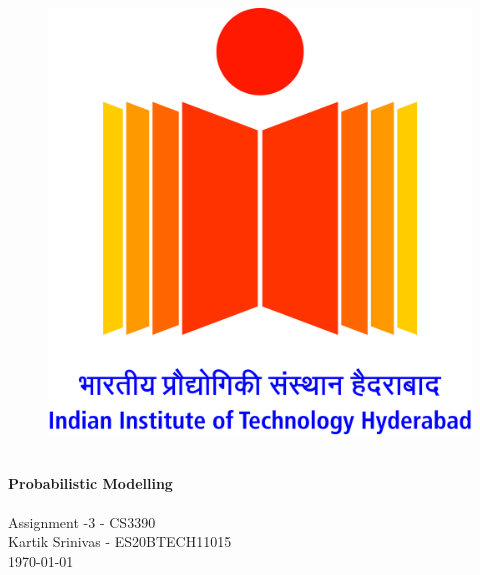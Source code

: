 \begin{titlepage}
    \vbox{ }

    \vbox{ }

    \begin{center}
        \begin{figure}
            \centering
            \includegraphics[scale=0.1]{img/logo.jpg}
            \label{fig:my_label}
        \end{figure}
        

        \noindent\makebox[\linewidth]{\rule{.7\paperwidth}{.6pt}}\\[0.7cm]
        { \huge \bfseries Probabilistic Modelling}\\[0.25cm]
        \noindent\makebox[\linewidth]{\rule{.7\paperwidth}{.6pt}}\\[0.7cm]
        \large{Assignment -3 - CS3390}\\[1.2cm]
        \vfill
        \large
        Kartik Srinivas - ES20BTECH11015\\
            {\large \today}
    \end{center}
\end{titlepage}